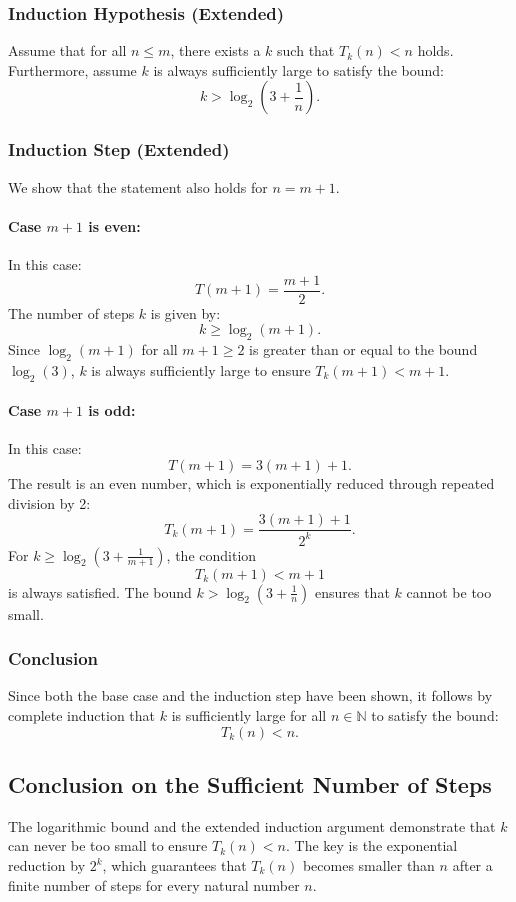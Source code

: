 \documentclass[a4paper,12pt]{article}
\begin{document}
\subsubsection{Induction Hypothesis (Extended)}
Assume that for all \( n \leq m \), there exists a \( k \) such that \( T_k(n) < n \) holds. Furthermore, assume \( k \) is always sufficiently large to satisfy the bound:
\[
k > \log_2\left(3 + \frac{1}{n}\right).
\]

\subsubsection{Induction Step (Extended)}
We show that the statement also holds for \( n = m + 1 \).

\paragraph{Case \( m + 1 \) is even:}
In this case:
\[
T(m + 1) = \frac{m + 1}{2}.
\]
The number of steps \( k \) is given by:
\[
k \geq \log_2(m + 1).
\]
Since \( \log_2(m + 1) \) for all \( m + 1 \geq 2 \) is greater than or equal to the bound \( \log_2(3) \), \( k \) is always sufficiently large to ensure \( T_k(m + 1) < m + 1 \).

\paragraph{Case \( m + 1 \) is odd:}
In this case:
\[
T(m + 1) = 3(m + 1) + 1.
\]
The result is an even number, which is exponentially reduced through repeated division by 2:
\[
T_k(m + 1) = \frac{3(m + 1) + 1}{2^k}.
\]
For \( k \geq \log_2\left(3 + \frac{1}{m + 1}\right) \), the condition
\[
T_k(m + 1) < m + 1
\]
is always satisfied. The bound \( k > \log_2\left(3 + \frac{1}{n}\right) \) ensures that \( k \) cannot be too small.

\subsubsection{Conclusion}
Since both the base case and the induction step have been shown, it follows by complete induction that \( k \) is sufficiently large for all \( n \in \mathbb{N} \) to satisfy the bound:
\[
T_k(n) < n.
\]

\subsection{Conclusion on the Sufficient Number of Steps}
The logarithmic bound and the extended induction argument demonstrate that \( k \) can never be too small to ensure \( T_k(n) < n \). The key is the exponential reduction by \( 2^k \), which guarantees that \( T_k(n) \) becomes smaller than \( n \) after a finite number of steps for every natural number \( n \).
\end{document}
